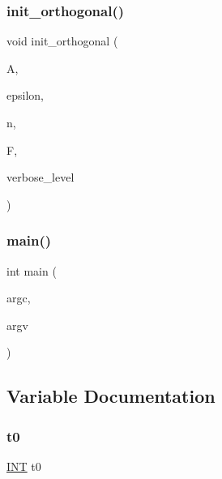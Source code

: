 \subsubsection{\texorpdfstring{init\+\_\+orthogonal()}{init\_orthogonal()}}
{\footnotesize\ttfamily void init\+\_\+orthogonal (\begin{DoxyParamCaption}\item[{\mbox{\hyperlink{classaction}{action}} $\ast$}]{A,  }\item[{\mbox{\hyperlink{galois_8h_a09fddde158a3a20bd2dcadb609de11dc}{I\+NT}}}]{epsilon,  }\item[{\mbox{\hyperlink{galois_8h_a09fddde158a3a20bd2dcadb609de11dc}{I\+NT}}}]{n,  }\item[{\mbox{\hyperlink{classfinite__field}{finite\+\_\+field}} $\ast$}]{F,  }\item[{\mbox{\hyperlink{galois_8h_a09fddde158a3a20bd2dcadb609de11dc}{I\+NT}}}]{verbose\+\_\+level }\end{DoxyParamCaption})}

\mbox{\label{_a_p_p_s_2_p_r_o_j_e_c_t_i_v_e___s_p_a_c_e_2polar_8_c_a217dbf8b442f20279ea00b898af96f52}} 
\subsubsection{\texorpdfstring{main()}{main()}}
{\footnotesize\ttfamily int main (\begin{DoxyParamCaption}\item[{int}]{argc,  }\item[{const char $\ast$$\ast$}]{argv }\end{DoxyParamCaption})}



\subsection{Variable Documentation}
\mbox{\label{_a_p_p_s_2_p_r_o_j_e_c_t_i_v_e___s_p_a_c_e_2polar_8_c_a4268f4fe222ffb119218a0199f5e1904}} 
\subsubsection{\texorpdfstring{t0}{t0}}
{\footnotesize\ttfamily \mbox{\hyperlink{galois_8h_a09fddde158a3a20bd2dcadb609de11dc}{I\+NT}} t0}

